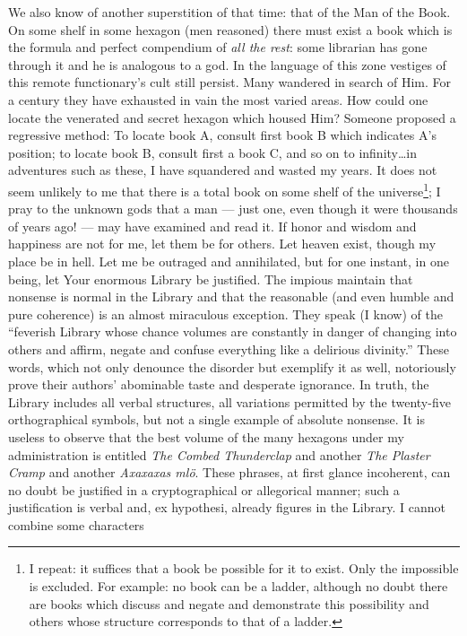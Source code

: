 \documentclass[oneside]{book}
\begin{document}
We also know of another superstition of that time: that of the Man of the Book. On some shelf in some hexagon (men reasoned) there must exist a book which is the formula and perfect compendium of \emph{all the rest}: some librarian has gone through it and he is analogous to a god. In the language of this zone vestiges of this remote functionary's cult still persist. Many wandered in search of Him. For a century they have exhausted in vain the most varied areas. How could one locate the venerated and secret hexagon which housed Him? Someone proposed a regressive method: To locate book A, consult first book B which indicates A's position; to locate book B, consult first a book C, and so on to infinity\dots in adventures such as these, I have squandered and wasted my years. It does not seem unlikely to me that there is a total book on some shelf of the universe\footnote{I repeat: it suffices that a book be possible for it to exist. Only the impossible is excluded. For example: no book can be a ladder, although no doubt there are books which discuss and negate and demonstrate this possibility and others whose structure corresponds to that of a ladder.}; I pray to the unknown gods that a man --- just one, even though it were thousands of years ago! --- may have examined and read it. If honor and wisdom and happiness are not for me, let them be for others. Let heaven exist, though my place be in hell. Let me be outraged and annihilated, but for one instant, in one being, let Your enormous Library be justified. The impious maintain that nonsense is normal in the Library and that the reasonable (and even humble and pure coherence) is an almost miraculous exception. They speak (I know) of the ``feverish Library whose chance volumes are constantly in danger of changing into others and affirm, negate and confuse everything like a delirious divinity.'' These words, which not only denounce the disorder but exemplify it as well, notoriously prove their authors' abominable taste and desperate ignorance. In truth, the Library includes all verbal structures, all variations permitted by the twenty-five orthographical symbols, but not a single example of absolute nonsense. It is useless to observe that the best volume of the many hexagons under my administration is entitled \emph{The Combed Thunderclap} and another \emph{The Plaster Cramp} and another \emph{Axaxaxas mlö}. These phrases, at first glance incoherent, can no doubt be justified in a cryptographical or allegorical manner; such a justification is verbal and,  ex hypothesi, already figures in the Library. I cannot combine some characters
\end{document}
